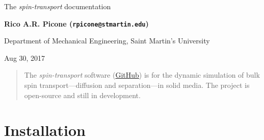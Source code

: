 \documentclass[%
oneside,                 %
final,                   %
10pt]{article}
\begin{document}

\newcommand{\exercisesection}[1]{\subsection*{#1}}






\thispagestyle{empty}

\begin{center}
{\LARGE\bf
\begin{spacing}{1.25}
The \emph{spin-transport} documentation
\end{spacing}
}
\end{center}


\begin{center}
{\bf Rico A.R. Picone (\texttt{rpicone@stmartin.edu})}
\end{center}

    \begin{center}
\centerline{{\small Department of Mechanical Engineering, Saint Martin's University}}
\end{center}
    

\begin{center}
Aug 30, 2017
\end{center}

\vspace{1cm}

\begin{abstract}
The \emph{spin-transport} software (\href{{https://github.com/ricopicone/spin-transport}}{GitHub}) is for the dynamic simulation of bulk spin transport---diffusion and separation---in solid media.
The project is open-source and still in development.
\end{abstract}

\tableofcontents


\vspace{1cm} %





\section{Installation}
\label{section:installation}
\end{document}
